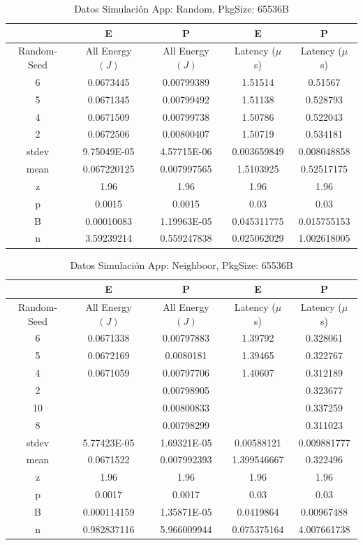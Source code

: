 \begin{table}[H]
\centering
\begin{tabular}{|c|c|c|c|c|}
\hline
 &E&P&E&P\\
\hline
Random-Seed&All Energy $(J)$&All Energy $(J)$&Latency ($\mu$ s)&Latency ($\mu$ s)\\
\hline
6&0.0673445&0.00799389&1.51514&0.51567\\
5&0.0671345&0.00799492&1.51138&0.528793\\
4&0.0671509&0.00799738&1.50786&0.522043\\
2&0.0672506&0.00800407&1.50719&0.534181\\
\hline
stdev&9.75049E-05&4.57715E-06&0.003659849&0.008048858\\
mean&0.067220125&0.007997565&1.5103925&0.52517175\\
z&1.96&1.96&1.96&1.96\\
p&0.0015&0.0015&0.03&0.03\\
B&0.00010083&1.19963E-05&0.045311775&0.015755153\\
\hline
n&3.59239214&0.559247838&0.025062029&1.002618005\\
\hline
\end{tabular}
\caption{Datos Simulación App: Random, PkgSize: 65536B}
\label{tb:sr65k}
\end{table}


\begin{table}[H]
\centering
\begin{tabular}{|c|c|c|c|c|}
\hline
 &E&P&E&P\\
\hline
Random-Seed&All Energy $(J)$&All Energy $(J)$&Latency ($\mu$ s)&Latency ($\mu$ s)\\
\hline
6&0.0671338&0.00797883&1.39792&0.328061\\
5&0.0672169&0.0080181&1.39465&0.322767\\
4&0.0671059&0.00797706&1.40607&0.312189\\
2&&0.00798905&&0.323677\\
10&&0.00800833&&0.337259\\
8&&0.00798299&&0.311023\\
\hline
stdev&5.77423E-05&1.69321E-05&0.00588121&0.009881777\\
mean&0.0671522&0.007992393&1.399546667&0.322496\\
z&1.96&1.96&1.96&1.96\\
p&0.0017&0.0017&0.03&0.03\\
B&0.000114159&1.35871E-05&0.0419864&0.00967488\\
\hline
n&0.982837116&5.966009944&0.075375164&4.007661738\\
\hline
\end{tabular}
\caption{Datos Simulación App: Neighboor, PkgSize: 65536B}
\label{tb:sn65k}
\end{table}


